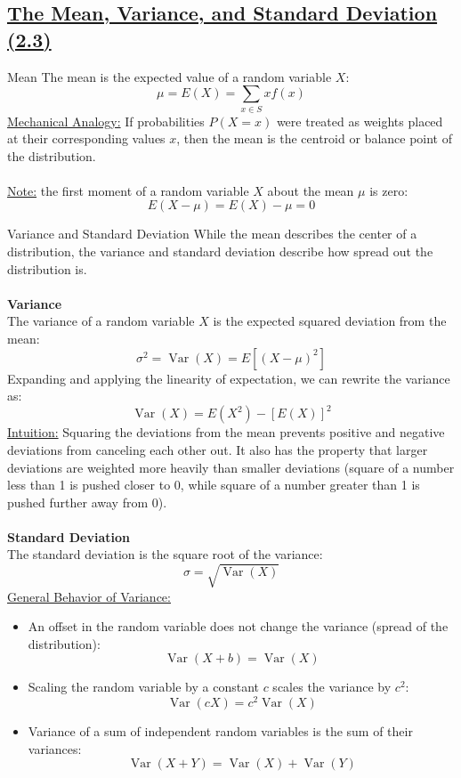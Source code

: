 ﻿\documentclass[12pt]{article}
\begin{document}
\subsection*{\underline{The Mean, Variance, and Standard Deviation (2.3)}}
\begin{definition}{Mean}
    The mean is the expected value of a random variable $X$:
    \[\mu = E(X) = \sum_{x \in S} x f(x)\]
    \underline{Mechanical Analogy:} If probabilities $P(X=x)$ were treated as weights placed at their corresponding values $x$, then the mean is the centroid or balance point of the distribution.\\\\
    \underline{Note:} the first moment of a random variable $X$ about the mean $\mu$ is zero:
    \[E(X-\mu) = E(X) - \mu = 0\]
\end{definition}
\begin{definition}{Variance and Standard Deviation}
    While the mean describes the center of a distribution, the variance and standard deviation describe how spread out the distribution is.\\\\
    \textbf{Variance}\\
    The variance of a random variable $X$ is the expected squared deviation from the mean:
    \[
\boxed{\sigma^2=\operatorname{Var}(X)=E[(X-\mu)^2]}
\]
Expanding and applying the linearity of expectation, we can rewrite the variance as:
\[\boxed{\operatorname{Var}(X) = E(X^2) - [E(X)]^2}\]
\underline{Intuition:} Squaring the deviations from the mean prevents positive and negative deviations from canceling each other out. It also has the property that larger deviations are weighted more heavily than smaller deviations (square of a number less than 1 is pushed closer to 0, while square of a number greater than 1 is pushed further away from 0).\\\\
\textbf{Standard Deviation}\\
The standard deviation is the square root of the variance:
\[\boxed{\sigma = \sqrt{\operatorname{Var}(X)}}\]
\underline{General Behavior of Variance:}
\begin{itemize}
    \item An offset in the random variable does not change the variance (spread of the distribution): $$\operatorname{Var}(X+b) = \operatorname{Var}(X)$$
    \item Scaling the random variable by a constant $c$ scales the variance by $c^2$: $$\operatorname{Var}(cX) = c^2\operatorname{Var}(X)$$
    \item Variance of a sum of independent random variables is the sum of their variances: $$\operatorname{Var}(X+Y) = \operatorname{Var}(X) + \operatorname{Var}(Y)$$
\end{itemize}
\end{definition}
\end{document}
